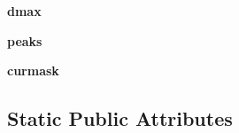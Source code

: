 \begin{DoxyCompactItemize}
\item 
\hypertarget{classmyImDisplay_1_1myImDisplay_af40bf78fd8315226eedca459d686ca05}{{\bfseries dmax}}\label{classmyImDisplay_1_1myImDisplay_af40bf78fd8315226eedca459d686ca05}

\item 
\hypertarget{classmyImDisplay_1_1myImDisplay_aead7802bb20d7a0d6d7f6f680b1cb7e2}{{\bfseries peaks}}\label{classmyImDisplay_1_1myImDisplay_aead7802bb20d7a0d6d7f6f680b1cb7e2}

\item 
\hypertarget{classmyImDisplay_1_1myImDisplay_afde0c76a92daa96ba2d868fe4ee9a228}{{\bfseries curmask}}\label{classmyImDisplay_1_1myImDisplay_afde0c76a92daa96ba2d868fe4ee9a228}

\end{DoxyCompactItemize}
\subsection*{Static Public Attributes}
